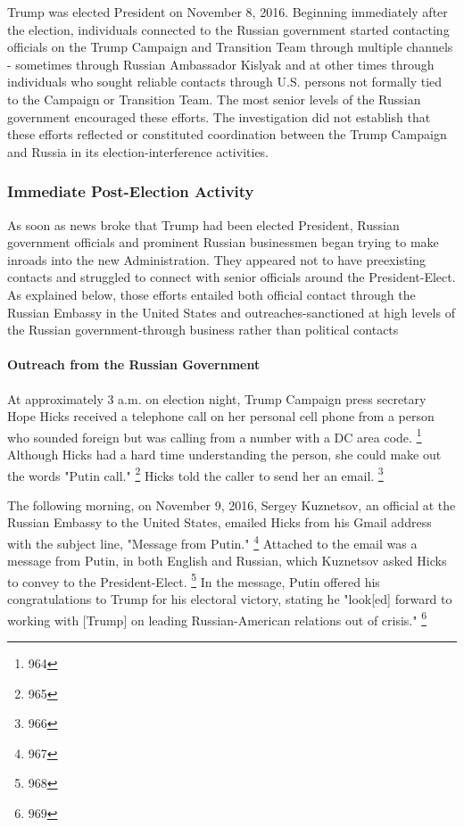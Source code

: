 Trump was elected President on November 8, 2016.
Beginning immediately after the election, individuals connected to the Russian government started contacting officials on the Trump Campaign and Transition Team through multiple channels - sometimes through Russian Ambassador Kislyak and at other times through individuals who sought reliable contacts through U.S. persons not formally tied to the Campaign or Transition Team.
The most senior levels of the Russian government encouraged these efforts.
The investigation did not establish that these efforts reflected or constituted coordination between the Trump Campaign and Russia in its election-interference activities.

\subsubsection{Immediate Post-Election Activity}

As soon as news broke that Trump had been elected President, Russian government officials and prominent Russian businessmen began trying to make inroads into the new Administration.
They appeared not to have preexisting contacts and struggled to connect with senior officials around the President-Elect.
As explained below, those efforts entailed both official contact through the Russian Embassy in the United States and outreaches-sanctioned at high levels of the Russian government-through business rather than political contacts

\paragraph{Outreach from the Russian Government}

At approximately 3 a.m. on election night, Trump Campaign press secretary Hope Hicks received a telephone call on her personal cell phone from a person who sounded foreign but was calling from a number with a DC area code.%
\footnote{964}
Although Hicks had a hard time understanding the person, she could make out the words "Putin call."%
\footnote{965}
Hicks told the caller to send her an email.%
\footnote{966}

The following morning, on November 9, 2016, Sergey Kuznetsov, an official at the Russian Embassy to the United States, emailed Hicks from his Gmail address with the subject line, "Message from Putin."%
\footnote{967}
Attached to the email was a message from Putin, in both English and Russian, which Kuznetsov asked Hicks to convey to the President-Elect.%
\footnote{968}
In the message, Putin offered his congratulations to Trump for his electoral victory, stating he "look[ed] forward to working with [Trump] on leading Russian-American relations out of crisis."%
\footnote{969}

